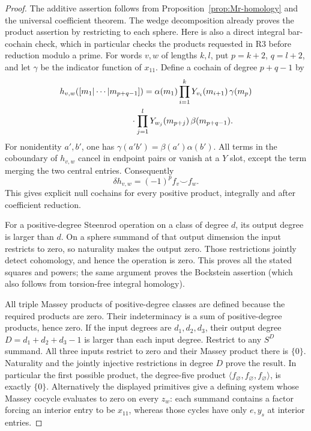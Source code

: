 \begin{proof}
The additive assertion follows from Proposition~\ref{prop:Mr-homology}
and the universal coefficient theorem.  The wedge decomposition
already proves the product assertion by restricting to each sphere.
Here is also a direct integral bar-cochain check, which in particular
checks the products requested in R3 before reduction modulo a prime.
For words $v,w$ of lengths $k,l$, put $p=k+2$, $q=l+2$, and let
$\gamma$ be the indicator function of $x_{11}$.  Define a cochain of
degree $p+q-1$ by
\[
 \begin{split}
 h_{v,w}([m_1|\cdots|m_{p+q-1}])={}&
 \alpha(m_1)\prod_{i=1}^{k}Y_{v_i}(m_{i+1})\,
 \gamma(m_p)\\
 &\hspace{-10mm}\cdot\prod_{j=1}^{l}Y_{w_j}(m_{p+j})\,
 \beta(m_{p+q-1}).
 \end{split}
\]
For nonidentity $a',b'$, one has
$\gamma(a'b')=\beta(a')\alpha(b')$.
All terms in the coboundary of $h_{v,w}$ cancel in endpoint pairs or
vanish at a $Y$ slot, except the term merging the two central entries.
Consequently
\[
       \delta h_{v,w}=(-1)^p f_v\smile f_w.
\]
This gives explicit null cochains for every positive product, integrally
and after coefficient reduction.

For a positive-degree Steenrod operation on a class of degree $d$, its
output degree is larger than $d$.  On a sphere summand of that output
dimension the input restricts to zero, so naturality makes the output
zero.  Those restrictions jointly detect cohomology, and hence the
operation is zero.  This proves all the stated squares and powers;
the same argument proves the Bockstein assertion (which also follows
from torsion-free integral homology).

All triple Massey products of positive-degree classes are defined
because the required products are zero.  Their indeterminacy is a sum
of positive-degree products, hence zero.  If the input degrees are
$d_1,d_2,d_3$, their output degree $D=d_1+d_2+d_3-1$ is larger than each
input degree.  Restrict to any $S^D$ summand.  All three inputs restrict
to zero and their Massey product there is $\{0\}$.  Naturality and the
jointly injective restrictions in degree $D$ prove the result.  In
particular the first possible product, the degree-five product
$\langle f_{\varnothing},f_{\varnothing},f_{\varnothing}\rangle$, is
exactly $\{0\}$.  Alternatively the displayed primitives give a
defining system whose Massey cocycle evaluates to zero on every
$z_w$: each summand contains a factor forcing an interior entry to be
$x_{11}$, whereas those cycles have only $e,y_s$ at interior entries.
\end{proof}

